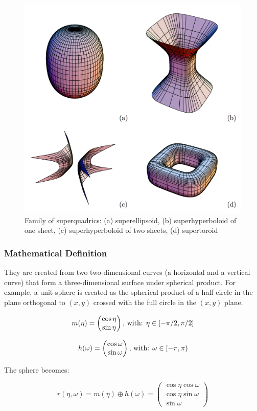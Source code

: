 \documentclass{article}
\begin{document}
\begin{figure}
\centering
\includegraphics[width=0.5\columnwidth]{figures/superquadric_family}
\caption{Family of superquadrics: (a) superellipsoid, (b) superhyperboloid of one sheet, (c) superhyperboloid of two sheets, (d) supertoroid}
\label{fig:superquadric_family}
\end{figure}

\subsubsection*{Mathematical Definition}
\label{sec:math}
They are created from two two-dimensional curves (a horizontal and a vertical curve) that form a three-dimensional surface under spherical product. For example, a unit sphere is created as the spherical product of a half circle in the plane orthogonal to $(x, y)$ crossed with the full circle in the $(x, y)$ plane.

\begin{equation}
m (\eta) = \begin{pmatrix} \cos {\eta} \\ \sin{\eta} \end{pmatrix} \textnormal{, with: } \eta \in [-\pi/2, \pi/2] 
\end{equation}

\begin{equation}
h(\omega) = \begin{pmatrix} \cos {\omega} \\ \sin {\omega} \end{pmatrix} \textnormal{, with: } \omega \in [-\pi, \pi)
\end{equation}

The sphere becomes:

\begin{equation}
r (\eta, \omega) = m (\eta) \oplus h (\omega) = \begin{pmatrix} \cos{\eta} \cos{\omega} \\ \cos{\eta} \sin{\omega} \\ \sin{\omega} \end{pmatrix}
\end{equation}
\end{document}
